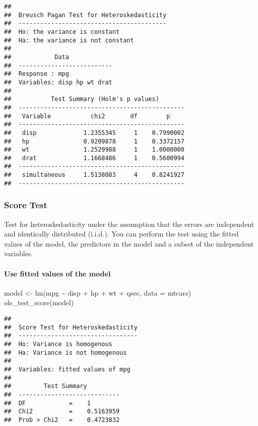 \documentclass[
]{article}
\newenvironment{Shaded}{\begin{snugshade}}{\end{snugshade}}
\newcommand{\AttributeTok}[1]{\textcolor[rgb]{0.77,0.63,0.00}{#1}}
\newcommand{\FunctionTok}[1]{\textcolor[rgb]{0.00,0.00,0.00}{#1}}
\newcommand{\NormalTok}[1]{#1}
\newcommand{\OtherTok}[1]{\textcolor[rgb]{0.56,0.35,0.01}{#1}}
\newcommand{\SpecialCharTok}[1]{\textcolor[rgb]{0.00,0.00,0.00}{#1}}
\begin{document}
\begin{verbatim}
## 
##  Breusch Pagan Test for Heteroskedasticity
##  -----------------------------------------
##  Ho: the variance is constant            
##  Ha: the variance is not constant        
## 
##            Data            
##  --------------------------
##  Response : mpg 
##  Variables: disp hp wt drat 
## 
##           Test Summary (Holm's p values)         
##  ----------------------------------------------
##   Variable           chi2       df        p     
##  ----------------------------------------------
##   disp             1.2355345     1    0.7990002 
##   hp               0.9209878     1    0.3372157 
##   wt               1.2529988     1    1.0000000 
##   drat             1.1668486     1    0.5600994 
##  ----------------------------------------------
##   simultaneous     1.5138083     4    0.8241927 
##  ----------------------------------------------
\end{verbatim}

\hypertarget{score-test}{%
\subsubsection{Score Test}\label{score-test}}

Test for heteroskedasticity under the assumption that the errors are
independent and identically distributed (i.i.d.). You can perform the
test using the fitted values of the model, the predictors in the model
and a subset of the independent variables.

\hypertarget{use-fitted-values-of-the-model-1}{%
\paragraph{Use fitted values of the
model}\label{use-fitted-values-of-the-model-1}}

\begin{Shaded}
\begin{Highlighting}[]
\NormalTok{model }\OtherTok{\textless{}{-}} \FunctionTok{lm}\NormalTok{(mpg }\SpecialCharTok{\textasciitilde{}}\NormalTok{ disp }\SpecialCharTok{+}\NormalTok{ hp }\SpecialCharTok{+}\NormalTok{ wt }\SpecialCharTok{+}\NormalTok{ qsec, }\AttributeTok{data =}\NormalTok{ mtcars)}
\FunctionTok{ols\_test\_score}\NormalTok{(model)}
\end{Highlighting}
\end{Shaded}

\begin{verbatim}
## 
##  Score Test for Heteroskedasticity
##  ---------------------------------
##  Ho: Variance is homogenous
##  Ha: Variance is not homogenous
## 
##  Variables: fitted values of mpg 
## 
##         Test Summary         
##  ----------------------------
##  DF            =    1 
##  Chi2          =    0.5163959 
##  Prob > Chi2   =    0.4723832
\end{verbatim}
\end{document}

